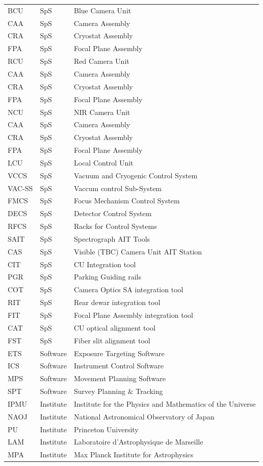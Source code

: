 \documentclass[a4paper]{article}
\begin{document}
\begin{longtable}{lll}
BCU	& SpS	& Blue Camera Unit \\
CAA	& SpS	& Camera Assembly \\
CRA	& SpS	& Cryostat Assembly \\
FPA	& SpS	& Focal Plane Assembly \\
RCU	& SpS	& Red Camera Unit \\
CAA	& SpS	& Camera Assembly \\
CRA	& SpS	& Cryostat Assembly \\
FPA	& SpS	& Focal Plane Assembly \\
NCU	& SpS	& NIR Camera Unit \\
CAA	& SpS	& Camera Assembly \\
CRA	& SpS	& Cryostat Assembly \\
FPA	& SpS	& Focal Plane Assembly \\
LCU	& SpS	& Local Control Unit \\
VCCS	& SpS	& Vacuum and Cryogenic Control System \\
VAC-SS	& SpS	& Vaccum control Sub-System \\
FMCS	& SpS	& Focus Mechanism Control System \\
DECS	& SpS	& Detector Control System \\
RFCS	& SpS	& Racks for Control Systems \\
SAIT	& SpS	& Spectrograph AIT Tools \\
CAS	& SpS	& Visible (TBC) Camera Unit AIT Station \\
CIT	& SpS	& CU Integration tool \\
PGR	& SpS	& Parking Guiding rails \\
COT	& SpS	& Camera Optics SA integration tool \\
RIT	& SpS	& Rear dewar integration tool \\
FIT	& SpS	& Focal Plane Assembly integration tool \\
CAT	& SpS	& CU optical alignment tool \\
FST	& SpS	& Fiber slit alignment tool \\
ETS	& Software	& Exposure Targeting Software\\
ICS	& Software	& Instrument Control Software \\
MPS	& Software	& Movement Planning Software \\
SPT	& Software	& Survey Planning \& Tracking\\
IPMU & Institute & Institute for the Physics and Mathematics of the Universe\\
NAOJ & Institute & National Astronomical Observatory of Japan\\
PU	& Institute	& Princeton University\\
LAM	& Institute & Laboratoire d'Astrophysique de Marseille\\
MPA	& Institute & Max Planck Institute for Astrophysics\\
\end{longtable}
\end{document}

